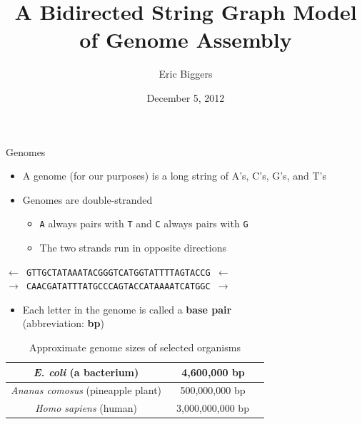 \documentclass[xcolor=dvipsnames]{beamer}
\begin{document}
\title{A Bidirected String Graph Model of Genome Assembly}
\author{Eric Biggers}
\date{December 5, 2012}


\frame{\titlepage}

\begin{frame}{Genomes}
	\begin{itemize}
		\item A genome (for our purposes) is a long string of A's, C's, G's, and T's
		\item Genomes are double-stranded
		\begin{itemize}
			\item {\tt A} always pairs with {\tt T} and {\tt C} always pairs
			with {\tt G}
			\item The two strands run in opposite directions
		\end{itemize}
	\end{itemize}
	\begin{center}
	{\tt $\leftarrow$ GTTGCTATAAATACGGGTCATGGTATTTTAGTACCG $\leftarrow$ \\}
	{\tt $\rightarrow$ CAACGATATTTATGCCCAGTACCATAAAATCATGGC $\rightarrow$}
	\end{center}
	\begin{itemize}
		\item Each letter in the genome is called a {\bf base pair} \\(abbreviation:
		{\bf bp})
	\end{itemize}
	\begin{table}[H]
		\caption{Approximate genome sizes of selected organisms}
		\begin{tabular}{|c|c|c|}
			\hline
			{\it E. coli} (a bacterium) &  ~4,600,000 bp \\
			\hline
			{\it Ananas comosus} (pineapple plant) &	~500,000,000 bp \\
			\hline
			{\it Homo sapiens} (human)       &  ~3,000,000,000 bp \\
			\hline
		\end{tabular}
	\end{table}
\end{frame}
\end{document}
